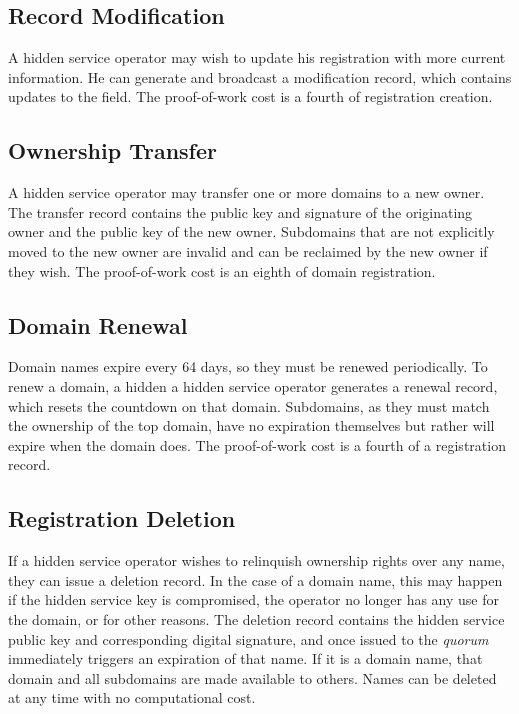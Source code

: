 
\subsection{Record Modification}

A hidden service operator may wish to update his registration with more current information. He can generate and broadcast a modification record, which contains updates to the field. The proof-of-work cost is a fourth of registration creation.

\subsection{Ownership Transfer}

A hidden service operator may transfer one or more domains to a new owner. The transfer record contains the public key and signature of the originating owner and the public key of the new owner. Subdomains that are not explicitly moved to the new owner are invalid and can be reclaimed by the new owner if they wish. The proof-of-work cost is an eighth of domain registration.

\subsection{Domain Renewal}

Domain names expire every 64 days, so they must be renewed periodically. To renew a domain, a hidden a hidden service operator generates a renewal record, which resets the countdown on that domain. Subdomains, as they must match the ownership of the top domain, have no expiration themselves but rather will expire when the domain does. The proof-of-work cost is a fourth of a registration record.

\subsection{Registration Deletion}

If a hidden service operator wishes to relinquish ownership rights over any name, they can issue a deletion record. In the case of a domain name, this may happen if the hidden service key is compromised, the operator no longer has any use for the domain, or for other reasons. The deletion record contains the hidden service public key and corresponding digital signature, and once issued to the \emph{quorum} immediately triggers an expiration of that name. If it is a domain name, that domain and all subdomains are made available to others. Names can be deleted at any time with no computational cost.

